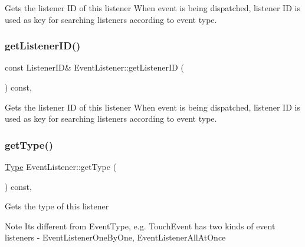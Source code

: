 Gets the listener ID of this listener When event is being dispatched, listener ID is used as key for searching listeners according to event type. \mbox{\label{classEventListener_ad6a1e5ec2ed320b48801228317d56624}} 
\subsubsection{\texorpdfstring{get\+Listener\+I\+D()}{getListenerID()}\hspace{0.1cm}{\footnotesize\ttfamily [2/2]}}
{\footnotesize\ttfamily const Listener\+ID\& Event\+Listener\+::get\+Listener\+ID (\begin{DoxyParamCaption}{ }\end{DoxyParamCaption}) const\hspace{0.3cm}{\ttfamily [inline]}, {\ttfamily [protected]}}

Gets the listener ID of this listener When event is being dispatched, listener ID is used as key for searching listeners according to event type. \mbox{\label{classEventListener_ab04aa6c4e270b35ecd801c276d98f3b4}} 
\subsubsection{\texorpdfstring{get\+Type()}{getType()}\hspace{0.1cm}{\footnotesize\ttfamily [1/2]}}
{\footnotesize\ttfamily \hyperlink{classEventListener_ab78e6acdfa2343490eda9e92d1555ee4}{Type} Event\+Listener\+::get\+Type (\begin{DoxyParamCaption}{ }\end{DoxyParamCaption}) const\hspace{0.3cm}{\ttfamily [inline]}, {\ttfamily [protected]}}

Gets the type of this listener \begin{DoxyNote}{Note}
It\textquotesingle{}s different from {\ttfamily Event\+Type}, e.\+g. Touch\+Event has two kinds of event listeners -\/ Event\+Listener\+One\+By\+One, Event\+Listener\+All\+At\+Once 
\end{DoxyNote}
\mbox{\label{classEventListener_ab04aa6c4e270b35ecd801c276d98f3b4}} 
